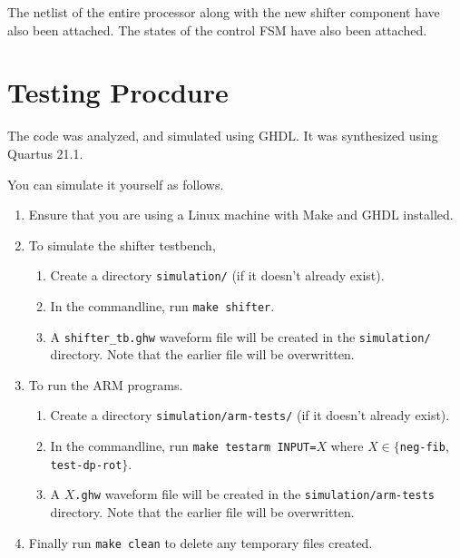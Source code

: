 \documentclass[a4paper]{scrartcl}
\renewcommand{\tt}{\texttt}
\begin{document}
The netlist of the entire processor along with the new shifter component have also been attached. The states of the control FSM have also been attached.

\clearpage
{}

\section{Testing Procdure}
The code was analyzed, and simulated using GHDL. It was synthesized using Quartus 21.1.

You can simulate it yourself as follows.
\begin{enumerate}
    \item Ensure that you are using a Linux machine with Make and GHDL installed.
    \item To simulate the shifter testbench,
        \begin{enumerate}
            \item Create a directory \tt{simulation/} (if it doesn't already exist).
            \item In the commandline, run \tt{make shifter}.
            \item A \tt{shifter_tb.ghw} waveform file will be created in the \tt{simulation/} directory. Note that the earlier file will be overwritten.
        \end{enumerate}
    \item To run the ARM programs.
        \begin{enumerate}
            \item Create a directory \tt{simulation/arm-tests/} (if it doesn't already exist).
            \item In the commandline, run \tt{make testarm INPUT=}$X$ where $X \in \{$\tt{neg-fib}, \tt{test-dp-rot}$\}$.
            \item A $X$\tt{.ghw} waveform file will be created in the \tt{simulation/arm-tests} directory. Note that the earlier file will be overwritten.
        \end{enumerate}
    \item Finally run \tt{make clean} to delete any temporary files created.
\end{enumerate}
\end{document}
